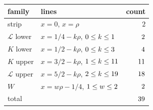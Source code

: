 \documentclass{amsart}
\makeatletter
\numberwithin{equation}{section}
\numberwithin{table}{section}
\newcommand{\captionof}[1]{\def\@captype{#1}\caption}
\newcommand{\Rseam}{8}
\newcommand{\fdiv}[2]{\the\numexpr(2*(#1)-(#2)+1)/(2*(#2))\relax}%
\newcommand{\kLlo}{\fdiv{\Rseam-1}{4}}
\newcommand{\kKlo}{\fdiv{\Rseam-1}{2}}
\newcommand{\kKhi}{\fdiv{3*\Rseam-1}{2}}
\newcommand{\kLhi}{\fdiv{5*\Rseam-1}{2}}
\newcommand{\wmax}{\fdiv{\Rseam+3}{4}}
\newcommand{\nlines}{\the\numexpr 2+(\kLlo+1)+(\kKlo+1)+\kKhi+(\kLhi-1)+\wmax\relax}
\makeatother
\begin{document}
\begin{center}\small\renewcommand{\arraystretch}{1.12}
\begin{minipage}{\textwidth}\centering
\captionof{table}{Line families of \eqref{eq:subdivision-lines}.}\label{tab:line-families}
\begin{tabular}{llr}
\hline
family & lines & count\\
\hline
strip & $x=0$, $x=\rho$ & $2$\\
$\mathcal L$ lower & $x=1/4-k\rho$, $0\le k\le\kLlo$ & $\the\numexpr\kLlo+1\relax$\\
$K$ lower & $x=1/2-k\rho$, $0\le k\le\kKlo$ & $\the\numexpr\kKlo+1\relax$\\
$K$ upper & $x=3/2-k\rho$, $1\le k\le\kKhi$ & $\kKhi$\\
$\mathcal L$ upper & $x=5/2-k\rho$, $2\le k\le\kLhi$ & $\the\numexpr\kLhi-1\relax$\\
$W$ & $x=w\rho-1/4$, $1\le w\le\wmax$ & $\wmax$\\
\hline
total & & $\nlines$\\
\hline
\end{tabular}
\end{minipage}
\end{center}
\end{document}
